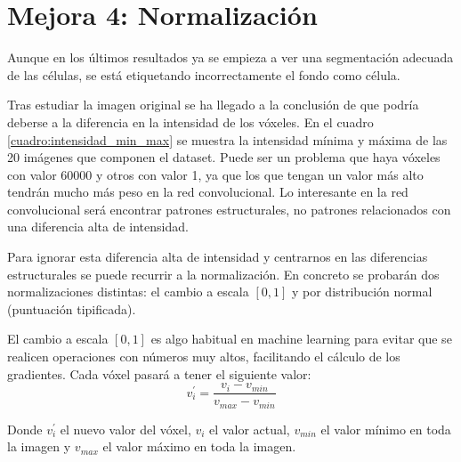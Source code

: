 \chapter{Mejora 4: Normalización}\label{znormalization}

Aunque en los últimos resultados ya se empieza a ver una segmentación adecuada de las células, se está etiquetando incorrectamente el fondo como célula.

Tras estudiar la imagen original se ha llegado a la conclusión de que podría deberse a la diferencia en la intensidad de los vóxeles. En el cuadro \ref{cuadro:intensidad_min_max} se muestra la intensidad mínima y máxima de las 20 imágenes que componen el dataset. Puede ser un problema que haya vóxeles con valor 60000 y otros con valor 1, ya que los que tengan un valor más alto tendrán mucho más peso en la red convolucional. Lo interesante en la red convolucional será encontrar patrones estructurales, no patrones relacionados con una diferencia alta de intensidad.


Para ignorar esta diferencia alta de intensidad y centrarnos en las diferencias estructurales se puede recurrir a la normalización. En concreto se probarán dos normalizaciones distintas: el cambio a escala $[0,1]$ y por distribución normal (puntuación tipificada).

El cambio a escala $[0,1]$ es algo habitual en machine learning para evitar que se realicen operaciones con números muy altos, facilitando el cálculo de los gradientes. Cada vóxel pasará a tener el siguiente valor:
\begin{equation}
v_i^{'} = \frac{v_i - v_{min}}{v_{max}-v_{min}}
\end{equation}

Donde $v_i^{'}$ el nuevo valor del vóxel, $v_i$ el valor actual, $v_{min}$ el valor mínimo en toda la imagen y $v_{max}$ el valor máximo en toda la imagen.


